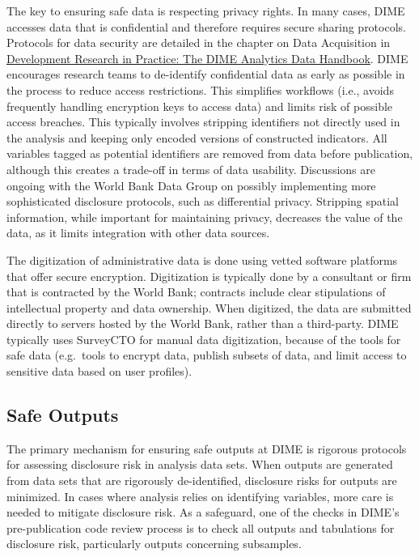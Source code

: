 The key to ensuring safe data is respecting privacy rights. In many cases, DIME accesses data that is confidential and therefore requires secure sharing protocols. Protocols for data security are detailed in the chapter on Data Acquisition in \href{https://worldbank.github.io/dime-data-handbook/}{Development Research in Practice: The DIME Analytics Data Handbook}. DIME encourages research teams to de-identify confidential data as early as possible in the process to reduce access restrictions. This simplifies workflows (i.e., avoids frequently handling encryption keys to access data) and limits risk of possible access breaches. This typically involves stripping identifiers not directly used in the analysis and keeping only encoded versions of constructed indicators. All variables tagged as potential identifiers are removed from data before publication, although this creates a trade-off in terms of data usability. Discussions are ongoing with the World Bank Data Group on possibly implementing more sophisticated disclosure protocols, such as differential privacy. Stripping spatial information, while important for maintaining privacy, decreases the value of the data, as it limits integration with other data sources.

The digitization of administrative data is done using vetted software platforms that offer secure encryption. Digitization is typically done by a consultant or firm that is contracted by the World Bank; contracts include clear stipulations of intellectual property and data ownership. When digitized, the data are submitted directly to servers hosted by the World Bank, rather than a third-party. DIME typically uses SurveyCTO for manual data digitization, because of the tools for safe data (e.g.~tools to encrypt data, publish subsets of data, and limit access to sensitive data based on user profiles).

\hypertarget{safe-outputs-6}{%
\subsection{Safe Outputs}\label{safe-outputs-6}}

The primary mechanism for ensuring safe outputs at DIME is rigorous protocols for assessing disclosure risk in analysis data sets. When outputs are generated from data sets that are rigorously de-identified, disclosure risks for outputs are minimized. In cases where analysis relies on identifying variables, more care is needed to mitigate disclosure risk. As a safeguard, one of the checks in DIME's pre-publication code review process is to check all outputs and tabulations for disclosure risk, particularly outputs concerning subsamples.

